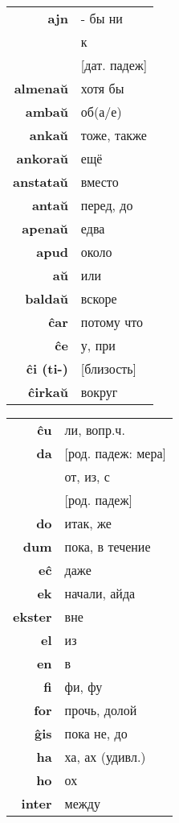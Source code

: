 \documentclass{article}
\begin{document}
\vspace{0.5em}
\begin{tabular}{>{\bfseries}rl}
ajn & - бы ни \\
\multirow{2}{*}{al} & к \\
& {}[дат. падеж] \\
almenaŭ & хотя бы \\
ambaŭ & об(а/е) \\
ankaŭ & тоже, также \\
ankoraŭ & ещё \\
anstataŭ & вместо \\
antaŭ & перед, до \\
apenaŭ & едва \\
apud & около \\
aŭ & или \\
baldaŭ & вскоре \\
ĉar & потому что \\
ĉe & у, при \\
ĉi (ti-) & {}[близость] \\
ĉirkaŭ & вокруг \\
\end{tabular}
\hspace{-1.25em}
\begin{tabular}{>{\bfseries}rl}
ĉu & ли, вопр.ч. \\
da & {}[род. падеж: мера] \\
\multirow{2}{*}{de} & от, из, с \\
& {}[род. падеж] \\
do & итак, же \\
dum & пока, в течение \\
eĉ & даже \\
ek & начали, айда \\
ekster & вне \\
el & из \\
en & в \\
fi & фи, фу \\
for & прочь, долой \\
ĝis & пока не, до \\
ha & ха, ах (удивл.) \\
ho & ох \\
inter & между \\
\end{tabular}
\hspace{-3.25em}
\end{document}
